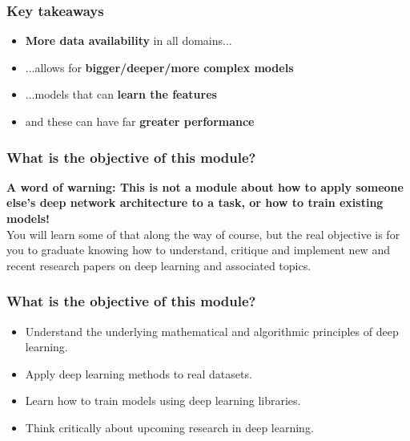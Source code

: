 \documentclass[]{article}
\begin{document}
\begin{frame}
	\frametitle{Key takeaways}

	\begin{itemize}
		\item<+-> \textbf{More data availability} in all domains...
		\item<+-> ...allows for \textbf{bigger/deeper/more complex models}
		\item<+-> ...models that can \textbf{learn the features}
		\item<+-> and these can have far \textbf{greater performance}
	\end{itemize}
\end{frame}

\begin{frame}
	\frametitle{What is the objective of this module?}

	\textbf{A word of warning: This is not a module about how to apply someone else's deep network architecture to a task, or how to train existing models!}
	\\[1em]
	You will learn some of that along the way of course, but the real objective is for you to graduate knowing how to understand, critique and implement new and recent research papers on deep learning and associated topics.
\end{frame}

\begin{frame}
	\frametitle{What is the objective of this module?}
	\begin{itemize}
		\item<+-> Understand the underlying mathematical and algorithmic principles of deep learning.
		\item<+-> Apply deep learning methods to real datasets.
		\item<+-> Learn how to train models using deep learning libraries.
		\item<+-> Think critically about upcoming research in deep learning.
		
	\end{itemize}
\end{frame}
\end{document}
